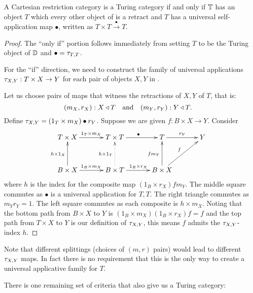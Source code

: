 \begin{theorem}\label{thm:turing_recognition}
  A Cartesian restriction category \D is a Turing category if and only if $\mathbb{T}$ has an object $T$
  which every other object of \D is a retract and $T$ has a universal self-application map
  $\bullet$, written as $T\times T \xrightarrow{\ \bullet\ }T$.
\end{theorem}
\begin{proof}
  The ``only if'' portion follows immediately from setting $T$ to be the Turing object of $\mathbb{D}$ and
  $\bullet = \tau_{{T},{T}}$.

  For the ``if'' direction, we need to construct the family of universal applications
  $\tau_{{X},{Y}} : T\times X \to Y$ for each pair of objects $X,Y$ in \D.

  Let us choose pairs of maps that witness the retractions of $X, Y$ of $T$, that is:
  \[
    (m_X,r_X):X \triangleleft T \quad\text{and}\quad(m_Y,r_Y):Y \triangleleft T.
  \]
  Define $\tau_{{X},{Y}} = (1_T\times m_X ) \bullet r_Y$. Suppose we are given $f:B\times X \to Y$. Consider
  \[
    \xymatrix@C+10pt@R+10pt{
      T \times X \ar[r]^{1_T\times m_X} & T\times T \ar[r]^{\bullet} & T \ar[r]^{r_Y} & Y \\
      B \times X \ar[r]^{1_B\times m_X} \ar[u]^{h\times 1_X}
        & B \times T \ar@{.>}[u]^{h\times 1_T} \ar[r]^{1_B \times r_X}
        & B \times X \ar[ur]^{f} \ar[u]^{f m_Y}
      }
  \]
  where $h$ is the index for the composite map $(1_B \times r_X) f m_Y$. The middle square commutes
  as $\bullet$ is a universal application for $T,T$. The right triangle commutes as $m_Y r_Y =1$.
  The left square commutes as each composite is $h \times m_X$. Noting that the bottom path from
  $B\times X$ to $Y$ is $(1_B \times m_X)(1_B \times r_X)f = f$ and the top path from $T\times X$ to
  $Y$ is our definition of $\tau_{{X},{Y}}$, this means $f$ admits the $\tau_{{X},{Y}}$-index $h$.
\end{proof}

Note that different splittings (choices of $(m,r)$ pairs) would lead to different $\tau_{{X},{Y}}$ maps. In
fact there is no requirement that this is the only way to create a universal applicative family
for $T$.

There is one remaining set of criteria that also give us a Turing category:

